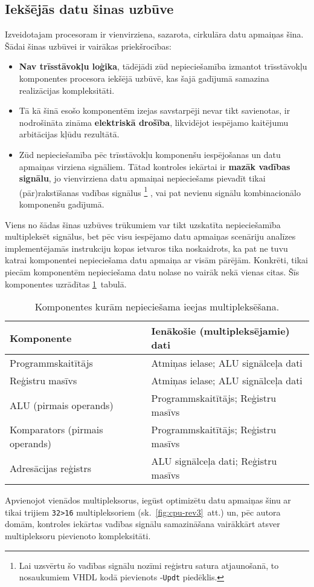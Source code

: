 \subsection{Iekšējās datu šinas uzbūve} \label{sec:databus}
Izveidotajam procesoram ir vienvirziena, sazarota, 
cirkulāra datu apmaiņas šina.
Šādai šinas uzbūvei ir vairākas priekšrocības:
\begin{itemize}
	\item \textbf{Nav trīsstāvokļu loģika}, tādējādi zūd nepieciešamība
		izmantot trīsstāvokļu komponentes procesora iekšējā uzbūvē,
		kas šajā gadījumā samazina realizācijas kompleksitāti.
	\item Tā kā šinā esošo komponentēm izejas savstarpēji nevar tikt
		savienotas, ir nodrošināta zināma \textbf{elektriskā drošība},
		likvidējot iespējamo kaitējumu arbitācijas kļūdu rezultātā.
	\item Zūd nepieciešamība pēc trīsstāvokļu komponenšu iespējošanas un
		datu apmaiņas virziena signāliem. Tātad kontroles iekārtai ir
		\textbf{mazāk vadības signālu}, jo vienvirziena datu
		apmaiņai nepieciešams pievadīt tikai (pār)rakstīšanas vadības signālus%
		\footnote{Lai uzsvērtu šo vadības signālu nozīmi reģistru satura
			atjaunošanā, to nosaukumiem VHDL kodā pievienots -\texttt{Updt} piedēklis.}%
		, vai pat nevienu signālu kombinacionālo komponenšu gadījumā.
\end{itemize}

Viens no šādas šinas uzbūves trūkumiem var tikt uzskatīta nepieciešamība
multipleksēt signālus, bet pēc visu iespējamo datu apmaiņas scenāriju analīzes
implementējamās instrukciju kopas ietvaros tika noskaidrots, ka pat ne tuvu 
katrai komponentei nepieciešama datu apmaiņa ar visām pārējām.
Konkrēti, tikai piecām komponentēm nepieciešama datu nolase no vairāk
nekā vienas citas. Šīs komponentes uzrādītas \ref{tbl:muxes}~tabulā.
\begin{table}[thb]
	\centering
	\caption{Komponentes kurām nepieciešama ieejas multipleksēšana.}
	\label{tbl:muxes}
	\begin{tabular}{ll}
		\toprule
		Komponente & Ienākošie (multipleksējamie) dati\\ 
		\midrule
		Programmskaitītājs & Atmiņas ielase; ALU signālceļa dati\\
		Reģistru masīvs & Atmiņas ielase; ALU signālceļa dati\\
		ALU (pirmais operands) & Programmskaitītājs; Reģistru masīvs\\
		Komparators (pirmais operands) & Programmskaitītājs; Reģistru masīvs\\
		Adresācijas reģistrs & ALU signālceļa dati; Reģistru masīvs\\
		\bottomrule
	\end{tabular}
\end{table}
Apvienojot vienādos multipleksorus, iegūst optimizētu datu apmaiņas šinu
ar tikai trijiem \texttt{32>16} multipleksoriem (sk.~\ref{fig:cpu-rev3}~att.)
un, pēc autora domām, kontroles iekārtas vadības signālu samazināšana vairākkārt
atsver multipleksoru pievienoto kompleksitāti.




